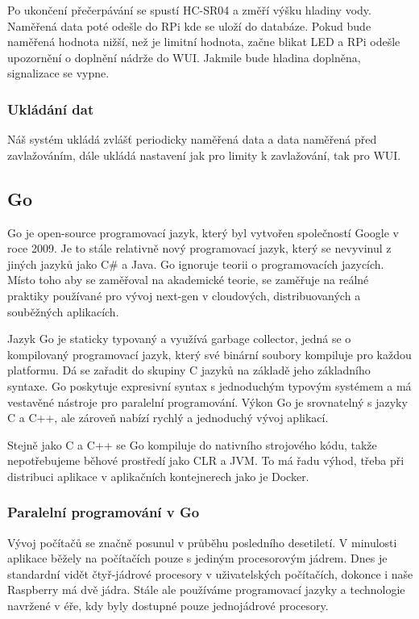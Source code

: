 \documentclass[12pt,a4paper]{article}
\begin{document}
Po ukončení přečerpávání se spustí \ac{HC-SR04} a změří výšku hladiny vody.
Naměřená
data poté odešle do \ac{RPi} kde se uloží do databáze. Pokud bude naměřená
hodnota
nižší, než je limitní hodnota, začne blikat \ac{LED} a \ac{RPi} odešle
upozornění o
doplnění nádrže do \ac{WUI}. Jakmile bude hladina doplněna, signalizace se
vypne.

\subsubsection{Ukládání dat}

Náš systém ukládá zvlášť periodicky naměřená data a data naměřená před
zavlažováním, dále ukládá nastavení jak pro limity k zavlažování, tak pro
\ac{WUI}.

\subsection{Go}

Go je open-source programovací jazyk, který byl vytvořen společností Google v
roce 2009. Je to stále relativně nový programovací jazyk, který se nevyvinul z
jiných jazyků jako C\# a Java. Go ignoruje teorii o programovacích jazycích.
Místo toho aby se zaměřoval na akademické teorie, se zaměřuje na reálné
praktiky používané pro vývoj next-gen v cloudových, distribuovaných a
souběžných aplikacích.

Jazyk Go je staticky typovaný a využívá garbage collector, jedná se o
kompilovaný programovací jazyk, který své binární soubory kompiluje pro každou
platformu. Dá se zařadit do skupiny C jazyků na základě jeho základního
syntaxe. Go poskytuje expresivní syntax s jednoduchým typovým systémem a má
vestavěné nástroje pro paralelní programování. Výkon Go je srovnatelný s jazyky
C a C++, ale zároveň nabízí rychlý a jednoduchý vývoj aplikací.

Stejně jako C a C++ se Go kompiluje do nativního strojového kódu, takže
nepotřebujeme běhové prostředí jako \ac{CLR} a \ac{JVM}. To má řadu výhod,
třeba při
distribuci aplikace v aplikačních kontejnerech jako je Docker.

\subsubsection{Paralelní programování v Go}

Vývoj počítačů se značně posunul v průběhu posledního desetiletí. V minulosti
aplikace běžely na počítačích pouze s jediným procesorovým jádrem. Dnes je
standardní vidět čtyř-jádrové procesory v uživatelských počítačích, dokonce i
naše Raspberry má dvě jádra. Stále ale používáme programovací jazyky a
technologie navržené v éře, kdy byly dostupné pouze jednojádrové procesory.
\end{document}
